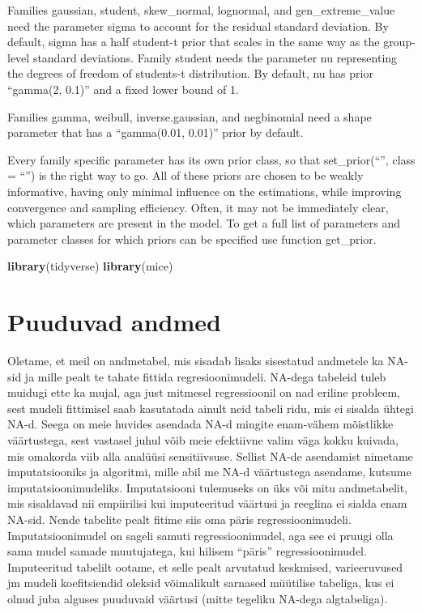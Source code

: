 \documentclass[]{book}
\newenvironment{Shaded}{\begin{snugshade}}{\end{snugshade}}
\newcommand{\KeywordTok}[1]{\textcolor[rgb]{0.13,0.29,0.53}{\textbf{#1}}}
\newcommand{\NormalTok}[1]{#1}
\begin{document}
Families gaussian, student, skew\_normal, lognormal, and
gen\_extreme\_value need the parameter sigma to account for the residual
standard deviation. By default, sigma has a half student-t prior that
scales in the same way as the group-level standard deviations. Family
student needs the parameter nu representing the degrees of freedom of
students-t distribution. By default, nu has prior ``gamma(2, 0.1)'' and
a fixed lower bound of 1.

Families gamma, weibull, inverse.gaussian, and negbinomial need a shape
parameter that has a ``gamma(0.01, 0.01)'' prior by default.

Every family specific parameter has its own prior class, so that
set\_prior(``'', class = ``'') is the right way to go. All of these
priors are chosen to be weakly informative, having only minimal
influence on the estimations, while improving convergence and sampling
efficiency. Often, it may not be immediately clear, which parameters are
present in the model. To get a full list of parameters and parameter
classes for which priors can be specified use function get\_prior.

\begin{Shaded}
\begin{Highlighting}[]
\KeywordTok{library}\NormalTok{(tidyverse)}
\KeywordTok{library}\NormalTok{(mice)}
\end{Highlighting}
\end{Shaded}

\chapter{Puuduvad andmed}\label{puuduvad-andmed}

Oletame, et meil on andmetabel, mis sisadab lisaks sisestatud andmetele
ka NA-sid ja mille pealt te tahate fittida regresioonimudeli. NA-dega
tabeleid tuleb muidugi ette ka mujal, aga just mitmesel regressioonil on
nad eriline probleem, sest mudeli fittimisel saab kasutatada ainult neid
tabeli ridu, mis ei sisalda ühtegi NA-d. Seega on meie huvides asendada
NA-d mingite enam-vähem mõistlikke väärtustega, sest vastasel juhul võib
meie efektiivne valim väga kokku kuivada, mis omakorda viib alla
analüüsi sensitiivsuse. Sellist NA-de asendamist nimetame
imputatsiooniks ja algoritmi, mille abil me NA-d väärtustega asendame,
kutsume imputatsioonimudeliks. Imputatsiooni tulemuseks on üks või mitu
andmetabelit, mis sisaldavad nii empiirilisi kui imputeeritud väärtusi
ja reeglina ei sialda enam NA-sid. Nende tabelite pealt fitime siis oma
päris regressioonimudeli. Imputatsioonimudel on sageli samuti
regressioonimudel, aga see ei pruugi olla sama mudel samade muutujatega,
kui hilisem ``päris'' regressioonimudel. Imputeeritud tabelilt ootame,
et selle pealt arvutatud keskmised, varieeruvused jm mudeli
koefitsiendid oleksid võimalikult sarnased müütilise tabeliga, kus ei
olnud juba alguses puuduvaid väärtusi (mitte tegeliku NA-dega
algtabeliga).
\end{document}
